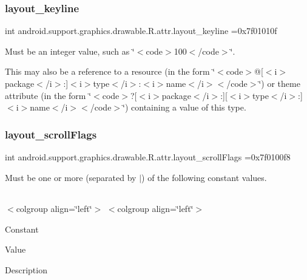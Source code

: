 \subsubsection{\texorpdfstring{layout\+\_\+keyline}{layout\_keyline}}
{\footnotesize\ttfamily int android.\+support.\+graphics.\+drawable.\+R.\+attr.\+layout\+\_\+keyline =0x7f01010f\hspace{0.3cm}{\ttfamily [static]}}

Must be an integer value, such as \char`\"{}$<$code$>$100$<$/code$>$\char`\"{}. 

This may also be a reference to a resource (in the form \char`\"{}$<$code$>$@\mbox{[}$<$i$>$package$<$/i$>$\+:\mbox{]}$<$i$>$type$<$/i$>$\+:$<$i$>$name$<$/i$>$$<$/code$>$\char`\"{}) or theme attribute (in the form \char`\"{}$<$code$>$?\mbox{[}$<$i$>$package$<$/i$>$\+:\mbox{]}\mbox{[}$<$i$>$type$<$/i$>$\+:\mbox{]}$<$i$>$name$<$/i$>$$<$/code$>$\char`\"{}) containing a value of this type. \mbox{\label{classandroid_1_1support_1_1graphics_1_1drawable_1_1R_1_1attr_a0e75b0c670e2be71119d8a695bdae52c}} 
\subsubsection{\texorpdfstring{layout\+\_\+scroll\+Flags}{layout\_scrollFlags}}
{\footnotesize\ttfamily int android.\+support.\+graphics.\+drawable.\+R.\+attr.\+layout\+\_\+scroll\+Flags =0x7f0100f8\hspace{0.3cm}{\ttfamily [static]}}

Must be one or more (separated by \textquotesingle{}$\vert$\textquotesingle{}) of the following constant values.

\tabulinesep=1mm
\begin{longtabu} spread 0pt [c]{*{0}{|X[-1]}|}
\hline
\end{longtabu}
$<$colgroup align=\char`\"{}left\char`\"{}$>$ $<$colgroup align=\char`\"{}left\char`\"{}$>$ 

Constant

Value

Description 

